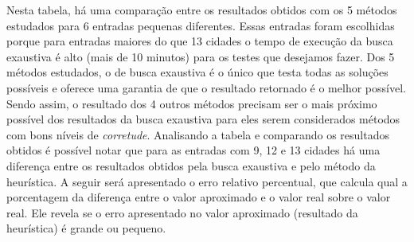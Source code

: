 \documentclass[11pt]{article}
\begin{document}
    Nesta tabela, há uma comparação entre os resultados obtidos com os 5
métodos estudados para 6 entradas pequenas diferentes. Essas entradas
foram escolhidas porque para entradas maiores do que 13 cidades o tempo
de execução da busca exaustiva é alto (mais de 10 minutos) para os
testes que desejamos fazer. Dos 5 métodos estudados, o de busca
exaustiva é o único que testa todas as soluções possíveis e oferece uma
garantia de que o resultado retornado é o melhor possível. Sendo assim,
o resultado dos 4 outros métodos precisam ser o mais próximo possível
dos resultados da busca exaustiva para eles serem considerados métodos
com bons níveis de \emph{corretude}. Analisando a tabela e comparando os
resultados obtidos é possível notar que para as entradas com 9, 12 e 13
cidades há uma diferença entre os resultados obtidos pela busca
exaustiva e pelo método da heurística. A seguir será apresentado o erro
relativo percentual, que calcula qual a porcentagem da diferença entre o
valor aproximado e o valor real sobre o valor real. Ele revela se o erro
apresentado no valor aproximado (resultado da heurística) é grande ou
pequeno.
\end{document}
